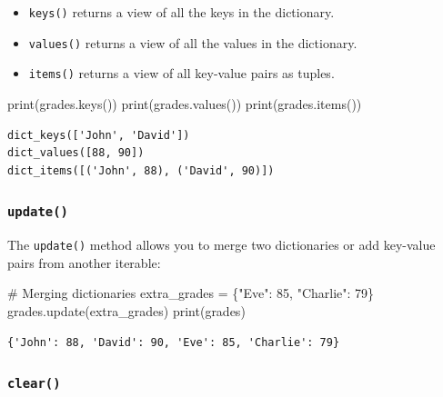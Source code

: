 \documentclass[
  letterpaper,
  DIV=11,
  numbers=noendperiod]{scrreprt}
\newenvironment{Shaded}{\begin{snugshade}}{\end{snugshade}}
\newcommand{\BuiltInTok}[1]{\textcolor[rgb]{0.00,0.23,0.31}{#1}}
\newcommand{\CommentTok}[1]{\textcolor[rgb]{0.37,0.37,0.37}{#1}}
\newcommand{\DecValTok}[1]{\textcolor[rgb]{0.68,0.00,0.00}{#1}}
\newcommand{\NormalTok}[1]{\textcolor[rgb]{0.00,0.23,0.31}{#1}}
\newcommand{\OperatorTok}[1]{\textcolor[rgb]{0.37,0.37,0.37}{#1}}
\newcommand{\StringTok}[1]{\textcolor[rgb]{0.13,0.47,0.30}{#1}}
\providecommand{\tightlist}{%
  \setlength{\itemsep}{0pt}\setlength{\parskip}{0pt}}\usepackage{longtable,booktabs,array}
\begin{document}
\begin{itemize}
\tightlist
\item
  \texttt{keys()} returns a view of all the keys in the dictionary.
\item
  \texttt{values()} returns a view of all the values in the dictionary.
\item
  \texttt{items()} returns a view of all key-value pairs as tuples.
\end{itemize}

\begin{Shaded}
\begin{Highlighting}[]
\BuiltInTok{print}\NormalTok{(grades.keys())   }
\BuiltInTok{print}\NormalTok{(grades.values()) }
\BuiltInTok{print}\NormalTok{(grades.items()) }
\end{Highlighting}
\end{Shaded}

\begin{verbatim}
dict_keys(['John', 'David'])
dict_values([88, 90])
dict_items([('John', 88), ('David', 90)])
\end{verbatim}

\hypertarget{update}{%
\subsubsection{\texorpdfstring{\texttt{update()}}{update()}}\label{update}}

The \texttt{update()} method allows you to merge two dictionaries or add
key-value pairs from another iterable:

\begin{Shaded}
\begin{Highlighting}[]
\CommentTok{\# Merging dictionaries}
\NormalTok{extra\_grades }\OperatorTok{=}\NormalTok{ \{}\StringTok{"Eve"}\NormalTok{: }\DecValTok{85}\NormalTok{, }\StringTok{"Charlie"}\NormalTok{: }\DecValTok{79}\NormalTok{\}}
\NormalTok{grades.update(extra\_grades)}
\BuiltInTok{print}\NormalTok{(grades) }
\end{Highlighting}
\end{Shaded}

\begin{verbatim}
{'John': 88, 'David': 90, 'Eve': 85, 'Charlie': 79}
\end{verbatim}

\hypertarget{clear}{%
\subsubsection{\texorpdfstring{\texttt{clear()}}{clear()}}\label{clear}}
\end{document}
